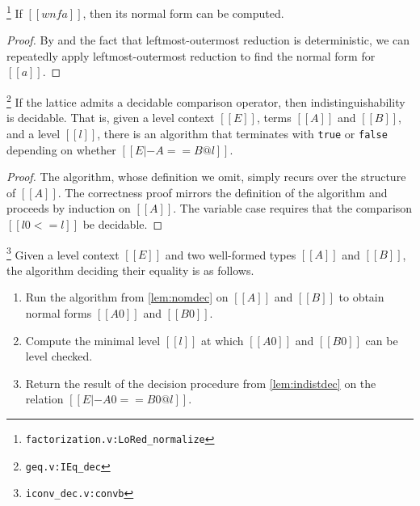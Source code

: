 \documentclass[acmsmall, screen=true, nonacm=true,
  review=\ifpublic false\else true\fi,
  anonymous=\ifanonymous true\else false\fi
]{acmart}
\newcommand{\suppl}[3]{{\scriptsize\texttt{#2:#3}}}
\newlength{\punctwidth}
\newcommand{\stack}[1]{%
  \settowidth{\punctwidth}{#1}%
  \hspace*{-\the\punctwidth}%
}
\begin{document}
\begin{corollary}
  \stack{.~}\footnote{\suppl{theories}{factorization.v}{LoRed\_normalize}}
  \label{lem:nomdec}
  If $[[wnf a]]$, then its normal form can be computed.
\end{corollary}
\begin{proof}
  By  and the fact that
  leftmost-outermost reduction is deterministic, we can repeatedly
  apply leftmost-outermost reduction to find the normal form for $[[a]]$.
\end{proof}

\begin{lemma}
  \stack{.~}\footnote{\suppl{theories}{geq.v}{IEq\_dec}}
  \label{lem:indistdec}
  If the lattice admits a decidable comparison operator, then indistinguishability
  is decidable. That is, given a level context $[[E]]$, terms
  $[[A]]$ and $[[B]]$, and a level $[[l]]$, there is an algorithm that
  terminates with \texttt{true} or \texttt{false} depending on whether
  $[[E |- A == B @ l]]$.
\end{lemma}

\begin{proof}
  The algorithm, whose definition we omit, simply recurs over the
  structure of $[[A]]$.
  The correctness proof mirrors the definition of the algorithm and
  proceeds by induction on $[[A]]$. The variable case requires that the
  comparison $[[l0 <= l]]$ be decidable.
\end{proof}

\begin{definition}
  \stack{.~}\footnote{\suppl{theories}{iconv\_dec.v}{convb}}
  \label{def:convalg}
  Given a level context $[[E]]$ and two well-formed types $[[A]]$
  and $[[B]]$, the algorithm deciding their equality is as follows.
  \begin{enumerate}
  \item \label{item:nf}
    Run the algorithm from \cref{lem:nomdec} on $[[A]]$ and
    $[[B]]$ to obtain normal forms $[[A0]]$ and $[[B0]]$.
  \item \label{item:min}
    Compute the minimal level $[[l]]$
    at which $[[A0]]$ and $[[B0]]$ can be level checked.
  \item \label{item:decide}
    Return the result of the decision procedure from
    \cref{lem:indistdec} on the relation
    $[[E |- A0 == B0 @ l]]$.
  \end{enumerate}
\end{definition}
\end{document}
